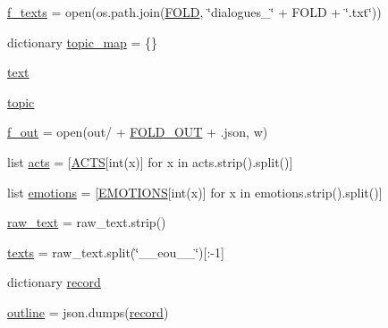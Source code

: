 \begin{DoxyCompactItemize}
\hyperlink{namespaceparlai_1_1tasks_1_1dailydialog_1_1parse_a47da41fc1bbbd6a59d8fc5c3640f46e8}{f\+\_\+texts} = open(os.\+path.\+join(\hyperlink{namespaceparlai_1_1tasks_1_1dailydialog_1_1parse_a8c9e030332871e8cb356bcb74c0ddc8c}{F\+O\+LD}, \char`\"{}dialogues\+\_\+\char`\"{} + F\+O\+LD + \char`\"{}.txt\char`\"{}))
\item 
dictionary \hyperlink{namespaceparlai_1_1tasks_1_1dailydialog_1_1parse_a1257c1312ee37cbf84fd9892736a6282}{topic\+\_\+map} = \{\}
\item 
\hyperlink{namespaceparlai_1_1tasks_1_1dailydialog_1_1parse_ad0b494b4bb78b7da65dba688516fd065}{text}
\item 
\hyperlink{namespaceparlai_1_1tasks_1_1dailydialog_1_1parse_a50ad2692c4cc4e33f1a5303dc3394ebe}{topic}
\item 
\hyperlink{namespaceparlai_1_1tasks_1_1dailydialog_1_1parse_ab6bfab164fed7ef268d5494379f02aee}{f\+\_\+out} = open(\textquotesingle{}out/\textquotesingle{} + \hyperlink{namespaceparlai_1_1tasks_1_1dailydialog_1_1parse_ae6d3cefc4e18c51bfedecae2c5bc875d}{F\+O\+L\+D\+\_\+\+O\+UT} + \textquotesingle{}.json\textquotesingle{}, \textquotesingle{}w\textquotesingle{})
\item 
list \hyperlink{namespaceparlai_1_1tasks_1_1dailydialog_1_1parse_ad099a0783a1e05f3cbe453600b28c6b0}{acts} = \mbox{[}\hyperlink{namespaceparlai_1_1tasks_1_1dailydialog_1_1parse_a780ada59eb3694949604bb14d68e2465}{A\+C\+TS}\mbox{[}int(x)\mbox{]} for x in acts.\+strip().split()\mbox{]}
\item 
list \hyperlink{namespaceparlai_1_1tasks_1_1dailydialog_1_1parse_adfeb415521d435bbc0f876aa2d7c7a76}{emotions} = \mbox{[}\hyperlink{namespaceparlai_1_1tasks_1_1dailydialog_1_1parse_a4dcf4c3798e88e5b49c655dee367234d}{E\+M\+O\+T\+I\+O\+NS}\mbox{[}int(x)\mbox{]} for x in emotions.\+strip().split()\mbox{]}
\item 
\hyperlink{namespaceparlai_1_1tasks_1_1dailydialog_1_1parse_a6928532917f959f2a4efb079fde20949}{raw\+\_\+text} = raw\+\_\+text.\+strip()
\item 
\hyperlink{namespaceparlai_1_1tasks_1_1dailydialog_1_1parse_ad9c36b3a53f03612c29b79525a210c75}{texts} = raw\+\_\+text.\+split(\char`\"{}\+\_\+\+\_\+eou\+\_\+\+\_\+\char`\"{})\mbox{[}\+:-\/1\mbox{]}
\item 
dictionary \hyperlink{namespaceparlai_1_1tasks_1_1dailydialog_1_1parse_a0774e7d0e2917f02dec4999e17c26eee}{record}
\item 
\hyperlink{namespaceparlai_1_1tasks_1_1dailydialog_1_1parse_a8def0964ca56880605d77f01e510fcf8}{outline} = json.\+dumps(\hyperlink{namespaceparlai_1_1tasks_1_1dailydialog_1_1parse_a0774e7d0e2917f02dec4999e17c26eee}{record})
\end{DoxyCompactItemize}



